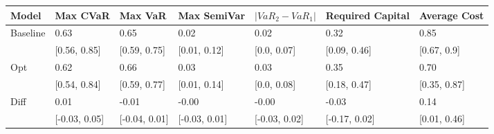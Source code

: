 \begin{tabular}{lllllll}
\toprule
   Model &      Max CVaR &       Max VaR &   Max SemiVar & $|VaR_2 - VaR_1|$ & Required Capital & Average Cost \\
\midrule
Baseline &          0.63 &          0.65 &          0.02 &              0.02 &             0.32 &         0.85 \\
         &  [0.56, 0.85] &  [0.59, 0.75] &  [0.01, 0.12] &       [0.0, 0.07] &     [0.09, 0.46] &  [0.67, 0.9] \\
     Opt &          0.62 &          0.66 &          0.03 &              0.03 &             0.35 &         0.70 \\
         &  [0.54, 0.84] &  [0.59, 0.77] &  [0.01, 0.14] &       [0.0, 0.08] &     [0.18, 0.47] & [0.35, 0.87] \\
    Diff &          0.01 &         -0.01 &         -0.00 &             -0.00 &            -0.03 &         0.14 \\
         & [-0.03, 0.05] & [-0.04, 0.01] & [-0.03, 0.01] &     [-0.03, 0.02] &    [-0.17, 0.02] & [0.01, 0.46] \\
\bottomrule
\end{tabular}
